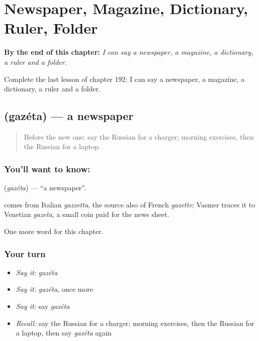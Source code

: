 
\chapter{Newspaper, Magazine, Dictionary, Ruler, Folder}
\label{ch:ru-newspaper-magazine-dictionary-ruler-folder}

\begin{chapteropening}
\textbf{By the end of this chapter:} \emph{I can say a newspaper, a magazine, a dictionary, a ruler and a folder.}

Complete the last lesson of chapter 192: I can say a newspaper, a magazine, a dictionary, a ruler and a folder.
\end{chapteropening}

\section[\texorpdfstring{\ru{газета} (gazéta)}{газета (gazéta)}]{ (gazéta) — a newspaper}

\label{lesson:RU-C192-gazeta}



\begin{quote}
Before the new one: say the Russian for a charger; morning exercises, then the Russian for a laptop.
\end{quote}

\subsection*{You'll want to know: }
\textbf{} (\emph{gazéta}) — \textquotedblleft{}a newspaper\textquotedblright{}.

\begin{cousinweb}
\textbf{} comes from Italian \emph{gazzetta}, the source also of French \emph{gazette}; Vasmer traces it to Venetian \emph{gazeta}, a small coin paid for the news sheet.
\end{cousinweb}

\begin{grammarlens}[title={What you've built}]
One more word for this chapter.
\end{grammarlens}

\subsection*{Your turn}
\begin{itemize}
\raggedright
  \item \emph{Say it:} \emph{gazéta}
  \item \emph{Say it:} \emph{gazéta}, once more
  \item \emph{Say it:} say \emph{gazéta}
  \item \emph{Recall:} say the Russian for a charger; morning exercises, then the Russian for a laptop, then say \emph{gazéta} again
\end{itemize}

